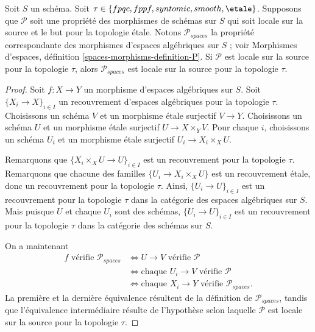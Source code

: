 \begin{lemma}
\label{lemma-transfer-from-schemes}
Soit $S$ un schéma.
Soit $\tau \in \{fpqc, \linebreak[0] fppf, \linebreak[0] syntomic, \linebreak[0]
smooth, \linebreak[0] \etale\}$.
Supposons que $\mathcal{P}$ soit une propriété des morphismes de schémas sur $S$
qui soit locale sur la source et le but pour la topologie \'etale. Notons $\mathcal{P}_{spaces}$
la propriété correspondante des morphismes d'espaces algébriques sur $S$ ; voir
Morphismes d'espaces, définition \ref{spaces-morphisms-definition-P}.
Si $\mathcal{P}$ est locale sur la source pour la topologie $\tau$, alors
$\mathcal{P}_{spaces}$ est locale sur la source pour la topologie $\tau$.
\end{lemma}

\begin{proof}
Soit $f : X \to Y$ un morphisme d'espaces algébriques sur $S$.
Soit $\{X_i \to X\}_{i \in I}$ un recouvrement d'espaces algébriques pour la topologie $\tau$.
Choisissons un schéma $V$ et un morphisme \'etale surjectif $V \to Y$.
Choisissons un schéma $U$ et un morphisme \'etale surjectif $U \to X \times_Y V$.
Pour chaque $i$, choisissons un schéma $U_i$ et un morphisme \'etale surjectif
$U_i \to X_i \times_X U$.

\medskip\noindent
Remarquons que $\{X_i \times_X U \to U\}_{i \in I}$ est un recouvrement pour la topologie $\tau$.
Remarquons que chacune des familles $\{U_i \to X_i \times_X U\}$ est un recouvrement \'etale,
donc un recouvrement pour la topologie $\tau$. Ainsi, $\{U_i \to U\}_{i \in I}$ est un
recouvrement pour la topologie $\tau$ dans la catégorie des espaces algébriques sur $S$. Mais puisque $U$ et chaque $U_i$
sont des schémas, $\{U_i \to U\}_{i \in I}$ est un
recouvrement pour la topologie $\tau$ dans la catégorie des schémas sur $S$.

\medskip\noindent
On a maintenant
\begin{align*}
f \text{ vérifie }\mathcal{P}_{spaces}
& \Leftrightarrow
U \to V \text{ vérifie }\mathcal{P} \\
& \Leftrightarrow
\text{chaque }U_i \to V \text{ vérifie }\mathcal{P} \\
& \Leftrightarrow
\text{chaque }X_i \to Y\text{ vérifie }\mathcal{P}_{spaces}.
\end{align*}
La première et la dernière équivalence résultent de la définition de
$\mathcal{P}_{spaces}$, tandis que l'équivalence intermédiaire résulte de l'hypothèse
selon laquelle $\mathcal{P}$ est locale sur la source pour la topologie $\tau$.
\end{proof}
